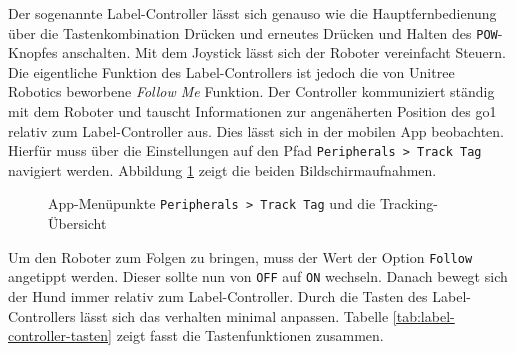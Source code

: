 Der sogenannte Label-Controller lässt sich genauso wie die Hauptfernbedienung über die Tastenkombination Drücken und
erneutes Drücken und Halten des \texttt{POW}-Knopfes anschalten.
Mit dem Joystick lässt sich der Roboter vereinfacht Steuern.
Die eigentliche Funktion des Label-Controllers ist jedoch die von Unitree Robotics beworbene \emph{Follow Me} Funktion.
Der Controller kommuniziert ständig mit dem Roboter und tauscht Informationen zur angenäherten Position des \gls{go1} relativ
zum Label-Controller aus.
Dies lässt sich in der mobilen App beobachten.
Hierfür muss über die Einstellungen auf den Pfad \texttt{Peripherals > Track Tag} navigiert werden.
Abbildung \ref{fig:follow-me} zeigt die beiden Bildschirmaufnahmen.

\begin{figure}[h]
    \caption{App-Menüpunkte \texttt{Peripherals > Track Tag} und die Tracking-Übersicht}\label{fig:follow-me}
\end{figure}

Um den Roboter zum Folgen zu bringen, muss der Wert der Option \texttt{Follow} angetippt werden.
Dieser sollte nun von \texttt{OFF} auf \texttt{ON} wechseln.
Danach bewegt sich der Hund immer relativ zum Label-Controller.
Durch die Tasten des Label-Controllers lässt sich das verhalten minimal anpassen.
Tabelle \ref{tab:label-controller-tasten} zeigt fasst die Tastenfunktionen zusammen.

